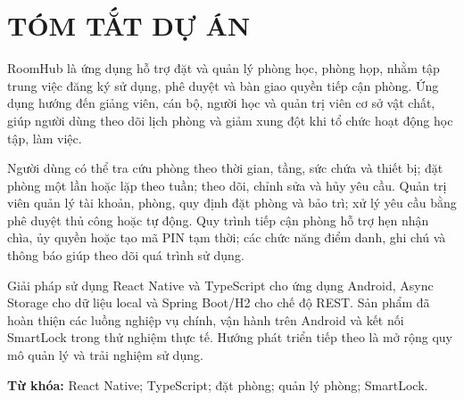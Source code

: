 \chapter*{TÓM TẮT DỰ ÁN}
RoomHub là ứng dụng hỗ trợ đặt và quản lý phòng học, phòng họp, nhằm tập trung việc đăng ký sử dụng, phê duyệt và bàn giao quyền tiếp cận phòng. Ứng dụng hướng đến giảng viên, cán bộ, người học và quản trị viên cơ sở vật chất, giúp người dùng theo dõi lịch phòng và giảm xung đột khi tổ chức hoạt động học tập, làm việc.

Người dùng có thể tra cứu phòng theo thời gian, tầng, sức chứa và thiết bị; đặt phòng một lần hoặc lặp theo tuần; theo dõi, chỉnh sửa và hủy yêu cầu. Quản trị viên quản lý tài khoản, phòng, quy định đặt phòng và bảo trì; xử lý yêu cầu bằng phê duyệt thủ công hoặc tự động. Quy trình tiếp cận phòng hỗ trợ hẹn nhận chìa, ủy quyền hoặc tạo mã PIN tạm thời; các chức năng điểm danh, ghi chú và thông báo giúp theo dõi quá trình sử dụng.

Giải pháp sử dụng React Native và TypeScript cho ứng dụng Android, Async Storage cho dữ liệu local và Spring Boot/H2 cho chế độ REST. Sản phẩm đã hoàn thiện các luồng nghiệp vụ chính, vận hành trên Android và kết nối SmartLock trong thử nghiệm thực tế. Hướng phát triển tiếp theo là mở rộng quy mô quản lý và trải nghiệm sử dụng.

\noindent\textbf{Từ khóa:} React Native; TypeScript; đặt phòng; quản lý phòng; SmartLock.
